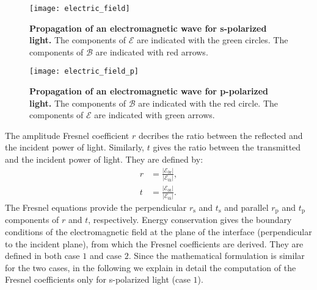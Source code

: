 \begin{figure}[t]
 \label{fig:electric_field}
     \begin{center}
     \texttt{[image: electric\_field]}
     \end{center}
     \caption{\textbf{Propagation of an electromagnetic wave for s-polarized light.} The components of $\boldsymbol{\mathcal{E}}$ are indicated with the green circles.
The components of $\boldsymbol{\mathcal{B}}$ are indicated with red arrows.}
\label{fig:electric_field}
 \end{figure}
\begin{figure}[t]
 \label{fig:electric_field_p}
     \begin{center}
     \texttt{[image: electric\_field\_p]}
     \end{center}
 \caption{\textbf{Propagation of an electromagnetic wave for p-polarized light.} The components of $\boldsymbol{\mathcal{B}}$ are indicated with the red circle.
The components of $\boldsymbol{\mathcal{E}}$ are indicated with green arrows.}
\label{fig:electric_field_p}
 \end{figure}
The amplitude Fresnel coefficient $r$ decribes the ratio between the reflected and the incident power of light. Similarly, $t$ gives the ratio between the transmitted and the incident power of light. They are defined by:
\begin{equation}
\begin{split}
r & =\frac{|\boldsymbol{\mathcal{E}}_{0 \textrm{r}}|}{|\boldsymbol{\mathcal{E}}_{0\textrm{i}}|}, \\
t & =\frac{|\boldsymbol{\mathcal{E}}_{0 \textrm{t}}|}{|\boldsymbol{\mathcal{E}}_{0\textrm{i}}|}.
\end{split}
\end{equation}
The Fresnel equations provide the perpendicular $r_\textrm{s}$ and $t_\textrm{s}$ and parallel $r_\textrm{p}$ and $t_\textrm{p}$ components of $r$ and $t$, respectively.
Energy conservation gives the boundary conditions of the electromagnetic field at the plane of the interface (perpendicular to the incident plane), from which the Fresnel coefficients are derived. They are defined in both case $1$ and case $2$. Since the mathematical formulation is similar for the two cases, in the following we explain in detail the computation of the Fresnel coefficients only for s-polarized light (case $1$).\\ 
